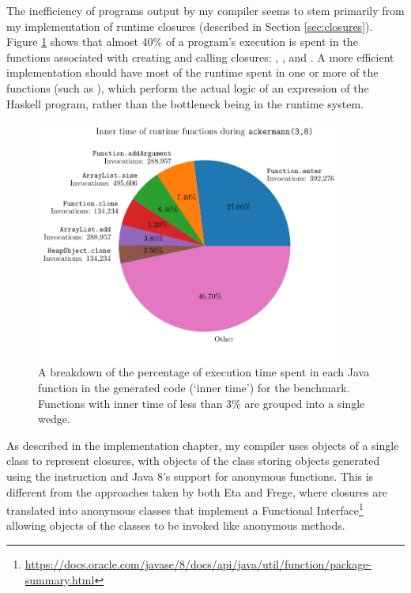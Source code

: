 \documentclass[dissertation.tex]{subfiles}
\begin{document}
{{\begin{figure}[h]
        \end{figure}

        The inefficiency of programs output by my compiler seems to stem primarily from my implementation of runtime
        closures (described in Section \ref{sec:closures}). Figure \ref{fig:inner-time} shows that almost 40\% of a
        program's execution is spent in the functions associated with creating and calling closures: ,
        , and . A more efficient implementation should have most of the runtime
        spent in one or more of the  functions (such as ), which perform the actual
        logic of an expression of the Haskell program, rather than the bottleneck being in the runtime system.

        \begin{figure}[h]
            \centering
            \captionsetup{width=0.8\textwidth}
            \includegraphics[width=0.9\textwidth]{graphs/perf_profile_ackermann.pdf}
            \caption{A breakdown of the percentage of execution time spent in each Java function in the generated code (`inner time') for the  benchmark. Functions with inner time of less than 3\% are grouped into a single wedge.}
            \label{fig:inner-time}
        \end{figure}

        As described in the implementation chapter, my compiler uses objects of a single class to represent closures,
        with objects of the class storing  objects generated using the 
        instruction and Java 8's support for anonymous functions. This is different from the approaches taken by both
        Eta and Frege, where closures are translated into anonymous classes that implement a Functional
        Interface\footnote{\url{https://docs.oracle.com/javase/8/docs/api/java/util/function/package-summary.html}}
        allowing objects of the classes to be invoked like anonymous methods.

}}
\end{document}
